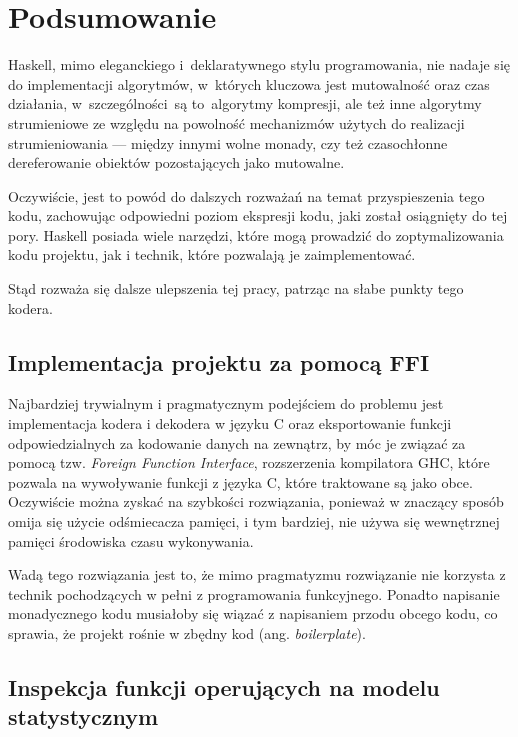 \documentclass[../../praca.tex]{subfiles}
\begin{document}
\chapter{Podsumowanie}

Haskell, mimo eleganckiego i~deklaratywnego stylu programowania,
nie nadaje się do implementacji algorytmów, w~których kluczowa
jest mutowalność oraz czas działania, w~szczególności~są to~algorytmy
kompresji, ale też inne algorytmy strumieniowe ze względu na powolność
mechanizmów użytych do realizacji strumieniowania --- między innymi
wolne monady, czy też czasochłonne dereferowanie obiektów pozostających
jako mutowalne. 

Oczywiście, jest to powód do dalszych rozważań na temat przyspieszenia
tego kodu, zachowując odpowiedni poziom ekspresji kodu, jaki został
osiągnięty do tej pory. Haskell posiada wiele narzędzi, które mogą
prowadzić do zoptymalizowania kodu projektu, jak i technik, które
pozwalają je zaimplementować.

Stąd rozważa się dalsze ulepszenia tej pracy, patrząc na słabe punkty tego kodera.

\section{Implementacja projektu za pomocą FFI}

Najbardziej trywialnym i pragmatycznym podejściem do problemu jest
implementacja kodera i dekodera w języku C oraz eksportowanie funkcji
odpowiedzialnych za kodowanie danych na zewnątrz, by móc je związać
za pomocą tzw. \emph{Foreign Function Interface}, rozszerzenia kompilatora
GHC, które pozwala na wywoływanie funkcji z języka C, które traktowane 
są jako obce. Oczywiście można zyskać na szybkości rozwiązania,
ponieważ w znaczący sposób omija się użycie odśmiecacza pamięci,
i tym bardziej, nie używa się wewnętrznej pamięci środowiska
czasu wykonywania.

Wadą tego rozwiązania jest to, że mimo pragmatyzmu rozwiązanie nie korzysta
z technik pochodzących w pełni z programowania funkcyjnego.
Ponadto napisanie monadycznego kodu musiałoby się wiązać
z napisaniem przodu obcego kodu, co sprawia, że projekt
rośnie w zbędny kod (ang. \emph{boilerplate}).

\section{Inspekcja funkcji operujących na modelu statystycznym}
\end{document}
